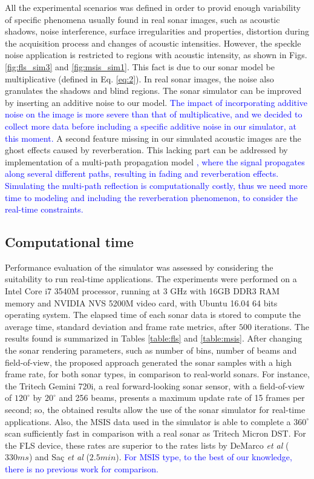 \documentclass[final,5p,times]{elsarticle}
\begin{document}
All the experimental scenarios was defined in order to provid enough variability of specific phenomena usually found in real sonar images, such as acoustic shadows, noise interference, surface irregularities and properties, distortion during the acquisition process and changes of acoustic intensities. However, the speckle noise application is restricted to regions with acoustic intensity, as shown in Figs. \ref{fig:fls_sim3} and \ref{fig:msis_sim1}. This fact is due to our sonar model be multiplicative (defined in Eq. \ref{eq:2}). In real sonar images, the noise also granulates the shadows and blind regions. The sonar simulator can be improved by inserting an additive noise to our model.
\textcolor{blue}{The impact of incorporating additive noise on the image is more severe than that of multiplicative, and we decided to collect more data before including a specific additive noise in our simulator, at this moment.} A second feature missing in our simulated acoustic images are the ghost effects caused by reverberation. This lacking part can be addressed by implementation of a multi-path propagation model \textcolor{blue}{\cite{huang2015b}, where the signal propagates along several different paths, resulting in fading and reverberation effects. Simulating the multi-path reflection is computationally costly, thus we need more time to modeling and including the reverberation phenomenon, to consider the real-time constraints.}

\subsection{Computational time}

Performance evaluation of the simulator was assessed by considering the suitability to run real-time applications. The experiments were performed on a Intel Core i7 3540M processor, running at 3 GHz with 16GB DDR3 RAM memory and NVIDIA NVS 5200M video card, with Ubuntu 16.04 64 bits operating system. The elapsed time of each sonar data is stored to compute the average time, standard deviation and frame rate metrics, after $500$ iterations. The results found is summarized in Tables \ref{table:fls} and \ref{table:msis}. After changing the sonar rendering parameters, such as number of bins, number of beams and field-of-view, the proposed approach generated the sonar samples with a high
frame rate, for both sonar types, in comparison to real-world sonars. For instance, the Tritech Gemini 720i, a real forward-looking sonar sensor, with a field-of-view of $120^{\circ}$ by $20^{\circ}$ and 256 beams, presents a maximum update rate of 15 frames per second; so, the obtained results allow the use of the sonar simulator for real-time applications. Also, the MSIS data used in the simulator is able to complete a $360^{\circ}$ scan sufficiently fast in comparison with a real sonar as Tritech Micron DST. For the FLS device, these rates are superior to the rates lists by DeMarco \textit{et al} \cite{demarco2015} ($330 ms$) and Saç \textit{et al} \cite{sac2015} ($2.5 min$). \textcolor{blue}{For MSIS type, to the best of our knowledge, there is no previous work for comparison.}
\end{document}
